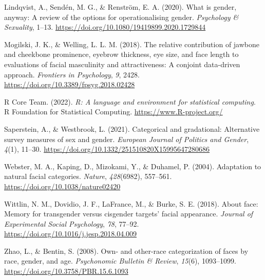 \documentclass[
  man]{apa7}
\newlength{\cslhangindent}
\newlength{\cslentryspacingunit} %
\newenvironment{CSLReferences}[2] %
 {%
  \setlength{\parindent}{0pt}
  \ifodd #1
  \let\oldpar\par
  \def\par{\hangindent=\cslhangindent\oldpar}
  \fi
  \setlength{\parskip}{#2\cslentryspacingunit}
 }%
 {}
\begin{document}
\begin{CSLReferences}{1}{0}
\leavevmode{}%
Lindqvist, A., Sendén, M. G., \& Renström, E. A. (2020). What is gender, anyway: A review of the options for operationalising gender. \emph{Psychology \& Sexuality}, 1--13. \url{https://doi.org/10.1080/19419899.2020.1729844}

\leavevmode{}%
Mogilski, J. K., \& Welling, L. L. M. (2018). The relative contribution of jawbone and cheekbone prominence, eyebrow thickness, eye size, and face length to evaluations of facial masculinity and attractiveness: A conjoint data-driven approach. \emph{Frontiers in Psychology}, \emph{9}, 2428. \url{https://doi.org/10.3389/fpsyg.2018.02428}

\leavevmode{}%
R Core Team. (2022). \emph{R: A language and environment for statistical computing}. R Foundation for Statistical Computing. \url{https://www.R-project.org/}

\leavevmode{}%
Saperstein, A., \& Westbrook, L. (2021). Categorical and gradational: Alternative survey measures of sex and gender. \emph{European Journal of Politics and Gender}, \emph{4}(1), 11--30. \url{https://doi.org/10.1332/251510820X15995647280686}

\leavevmode{}%
Webster, M. A., Kaping, D., Mizokami, Y., \& Duhamel, P. (2004). Adaptation to natural facial categories. \emph{Nature}, \emph{428}(6982), 557--561. \url{https://doi.org/10.1038/nature02420}

\leavevmode{}%
Wittlin, N. M., Dovidio, J. F., LaFrance, M., \& Burke, S. E. (2018). About face: Memory for transgender versus cisgender targets' facial appearance. \emph{Journal of Experimental Social Psychology}, \emph{78}, 77--92. \url{https://doi.org/10.1016/j.jesp.2018.04.009}

\leavevmode{}%
Zhao, L., \& Bentin, S. (2008). Own- and other-race categorization of faces by race, gender, and age. \emph{Psychonomic Bulletin \& Review}, \emph{15}(6), 1093--1099. \url{https://doi.org/10.3758/PBR.15.6.1093}

\end{CSLReferences}
\end{document}
